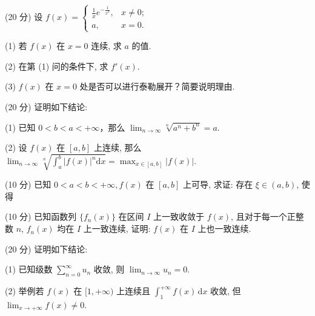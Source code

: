 (20 分) 设 $f(x) = \begin{cases} \frac{1}{x} e^{-\frac{1}{x^2}}, & x \neq 0; \\ a, & x = 0. \end{cases}$\par
(1) 若 $f(x)$ 在 $x = 0$ 连续, 求 $a$ 的值.\par
(2) 在第 (1) 问的条件下, 求 $f'(x)$.\par
(3) $f(x)$ 在 $x = 0$ 处是否可以进行泰勒展开？简要说明理由.\par
(20 分) 证明如下结论:\par
(1) 已知 $0 < b < a < +\infty$，那么 $\lim_{n \to \infty} \sqrt[n]{a^n + b^n} = a$.\par
(2) 设 $f(x)$ 在 $[a, b]$ 上连续, 那么 $\lim_{n \to \infty} \sqrt[n]{\int_{a}^{b} |f(x)|^{n} \mathrm{d}x} = \max_{x \in [a, b]} |f(x)|$.\par
\par{}
(10 分) 已知 $0 < a < b < +\infty, f(x)$ 在 $[a, b]$ 上可导, 求证: 存在 $\xi \in (a, b)$, 使得\par
\nopagebreak[4]
(10 分) 已知函数列 $\{f_n(x)\}$ 在区间 $I$ 上一致收敛于 $f(x)$, 且对于每一个正整数 $n$, $f_n(x)$ 均在 $I$ 上一致连续, 证明: $f(x)$ 在 $I$ 上也一致连续.\par
(20 分) 证明如下结论:\par
(1) 已知级数 $\sum_{n=0}^{\infty} u_n$ 收敛, 则 $\lim_{n \to \infty} u_n = 0$.\par
(2) 举例若 $f(x)$ 在 $[1, +\infty)$ 上连续且 $\int_{1}^{+\infty} f(x) \, \mathrm{d}x$ 收敛, 但 $\lim_{x \to +\infty} f(x) \neq 0$.\par
